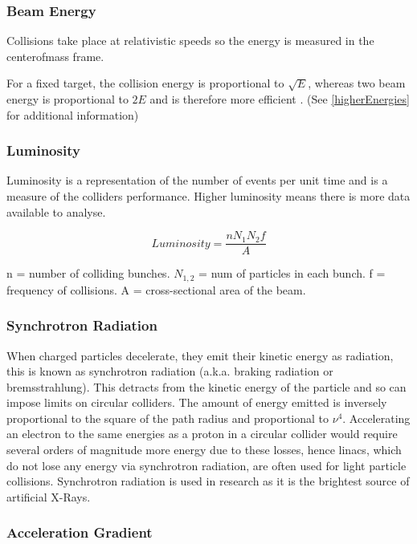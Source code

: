  \subsubsection{Beam Energy}
 
 Collisions take place at relativistic speeds so the energy is measured in the center\textendash of\textendash mass frame.
 
 For a fixed target, the collision energy is proportional to $\sqrt{E}$, whereas two beam energy is proportional to $2E$ and is therefore more efficient \cite{ITP:Energy}. (See \ref{higherEnergies} for additional information)
 
 \subsubsection{Luminosity}
 
 Luminosity is a representation of the number of events per unit time and is a measure of the colliders performance. Higher luminosity means there is more data available to analyse.
 
 $$
 Luminosity = \frac{n N_1 N_2 f}{A}
 $$
 
 n = number of colliding bunches. $N_{1,2}$ = num of particles in each bunch. f = frequency of collisions. A = cross-sectional area of the beam.
 
 \subsubsection{Synchrotron Radiation}
 
 When charged particles decelerate, they emit their kinetic energy as radiation, this is known as synchrotron radiation (a.k.a. braking radiation or bremsstrahlung). 
 This detracts from the kinetic energy of the particle and so can impose limits on circular colliders. 
 The amount of energy emitted is inversely proportional to the square of the path radius and proportional to $\nu^4$. Accelerating an electron to the same energies as a proton in a circular collider would require several orders of magnitude more energy due to these losses, hence linacs, which do not lose any energy via synchrotron radiation, are often used for light particle collisions. Synchrotron radiation is used in research as it is the brightest source of artificial X-Rays.
 
 \subsubsection{Acceleration Gradient}
 
